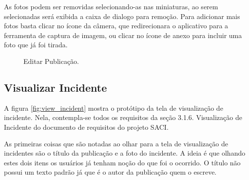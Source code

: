 \documentclass[12pt]{article}
\begin{document}
As fotos podem ser removidas selecionando-as nas miniaturas, ao serem selecionadas será exibida a caixa de dialogo para remoção. Para adicionar mais fotos basta clicar no ícone da câmera, que redirecionara o aplicativo para a ferramenta de captura de imagem, ou clicar no ícone de anexo para incluir uma foto que já foi tirada.



\begin{figure}[h!]
  \caption{Editar Publicação.}
  \label{fig:edit_publi}
\end{figure}
\vfill%
\pagebreak%


\subsection{Visualizar Incidente}\label{subsec:SecverInci}
A figura \ref{fig:view_incident} mostra o protótipo da tela de visualização de incidente. Nela, contempla-se todos os requisitos da seção 3.1.6. Visualização de Incidente do documento de requisitos do projeto SACI. 

As primeiras coisas que são notadas ao olhar para a tela de visualização de incidentes são o título da publicação e a foto do incidente. A ideia é que olhando estes dois itens os usuários já tenham noção do que foi o ocorrido. O título não possui um texto padrão já que é o autor da publicação quem o escreve.
\end{document}
